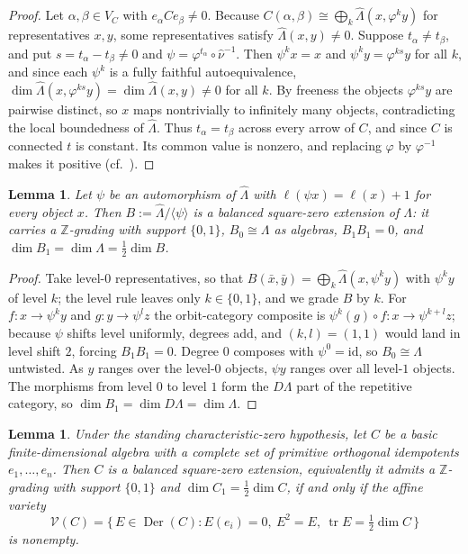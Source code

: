 \documentclass[11pt]{amsart}
\theoremstyle{plain}
\newtheorem{lemma}[theorem]{Lemma}
\theoremstyle{definition}
\DeclareMathOperator{\Der}{Der}
\DeclareMathOperator{\tr}{tr}
\newcommand{\rep}{\widehat{\Lambda}}
\newcommand{\Nak}{\widehat{\nu}}
\newcommand{\cV}{\mathcal{V}}
\newcommand{\ZZ}{\mathbb{Z}}
\begin{document}
\begin{proof}
Let $\alpha,\beta\in V_C$ with $e_\alpha C e_\beta\neq 0$. Because
$C(\alpha,\beta)\cong\bigoplus_k\rep(x,\varphi^k y)$ for representatives $x,y$, some representatives satisfy
$\rep(x,y)\neq 0$. Suppose $t_\alpha\neq t_\beta$, and put $s=t_\alpha-t_\beta\neq 0$ and
$\psi=\varphi^{t_\alpha}\circ\Nak^{-1}$. Then $\psi^k x=x$ and $\psi^k y=\varphi^{ks}y$ for all $k$, and since
each $\psi^k$ is a fully faithful autoequivalence, $\dim\rep(x,\varphi^{ks}y)=\dim\rep(x,y)\neq 0$ for all
$k$. By freeness the objects $\varphi^{ks}y$ are pairwise distinct, so $x$ maps nontrivially to infinitely
many objects, contradicting the local boundedness of $\rep$. Thus $t_\alpha=t_\beta$ across every arrow of
$C$, and since $C$ is connected $t$ is constant. Its common value is nonzero, and replacing $\varphi$ by
$\varphi^{-1}$ makes it positive (cf.~\cite[Remark~3.3]{DI}).
\end{proof}

\begin{lemma}\label{lem:grading}
Let $\psi$ be an automorphism of $\rep$ with $\ell(\psi x)=\ell(x)+1$ for every object $x$. Then
$B:=\rep/\langle\psi\rangle$ is a balanced square-zero extension of $\Lambda$: it carries a $\ZZ$-grading with
support $\{0,1\}$, $B_0\cong\Lambda$ as algebras, $B_1 B_1=0$, and $\dim B_1=\dim\Lambda=\tfrac12\dim B$.
\end{lemma}

\begin{proof}
Take level-$0$ representatives, so that $B(\bar x,\bar y)=\bigoplus_k\rep(x,\psi^k y)$ with $\psi^k y$ of
level $k$; the level rule leaves only $k\in\{0,1\}$, and we grade $B$ by $k$. For $f\colon x\to\psi^k y$ and
$g\colon y\to\psi^l z$ the orbit-category composite is $\psi^k(g)\circ f\colon x\to\psi^{k+l}z$; because
$\psi$ shifts level uniformly, degrees add, and $(k,l)=(1,1)$ would land in level shift $2$, forcing
$B_1B_1=0$. Degree $0$ composes with $\psi^0=\mathrm{id}$, so $B_0\cong\Lambda$ untwisted. As $y$ ranges over
the level-$0$ objects, $\psi y$ ranges over all level-$1$ objects. The morphisms from level $0$ to level $1$
form the $D\Lambda$ part of the repetitive category, so $\dim B_1=\dim D\Lambda=\dim\Lambda$.
\end{proof}

\begin{lemma}\label{lem:der}
Under the standing characteristic-zero hypothesis, let $C$ be a basic finite-dimensional algebra with a
complete set of primitive orthogonal idempotents $e_1,\dots,e_n$. Then $C$ is a balanced square-zero
extension, equivalently it admits a $\ZZ$-grading with support $\{0,1\}$ and $\dim C_1=\tfrac12\dim C$, if and
only if the affine variety
\[
  \cV(C)=\bigl\{\,E\in\Der(C):E(e_i)=0,\ E^2=E,\ \tr E=\tfrac12\dim C\,\bigr\}
\]
is nonempty.
\end{lemma}
\end{document}
